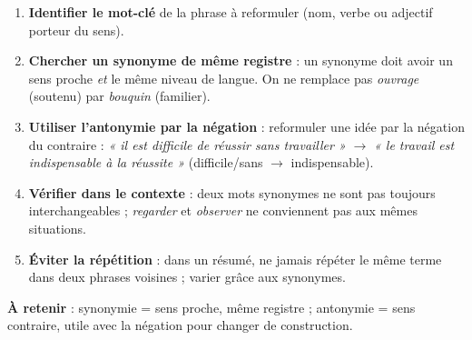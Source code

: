 \documentclass[11pt]{article}
\begin{document}
\begin{methode}
\begin{enumerate}
\item \textbf{Identifier le mot-clé} de la phrase à reformuler (nom, verbe ou adjectif porteur du sens).
\item \textbf{Chercher un synonyme de même registre} : un synonyme doit avoir un sens proche \emph{et} le même niveau de langue. On ne remplace pas \emph{ouvrage} (soutenu) par \emph{bouquin} (familier).
\item \textbf{Utiliser l'antonymie par la négation} : reformuler une idée par la négation du contraire : \emph{« il est difficile de réussir sans travailler »} $\rightarrow$ \emph{« le travail est indispensable à la réussite »} (difficile/sans $\rightarrow$ indispensable).
\item \textbf{Vérifier dans le contexte} : deux mots synonymes ne sont pas toujours interchangeables ; \emph{regarder} et \emph{observer} ne conviennent pas aux mêmes situations.
\item \textbf{Éviter la répétition} : dans un résumé, ne jamais répéter le même terme dans deux phrases voisines ; varier grâce aux synonymes.
\end{enumerate}
\textbf{À retenir} : synonymie = sens proche, même registre ; antonymie = sens contraire, utile avec la négation pour changer de construction.
\end{methode}
\end{document}
